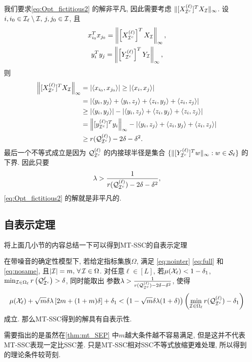 我们要求\eqref{eq:Opt_fictitious2} 的解非平凡, 因此需要考虑
\(\|[X_{\mathcal{I}^c}^{(\ell)}]^T X_{\mathcal{I}} \|_{\infty} \).
设\(i, i_0\in \mathcal{I}_\ell \setminus \mathcal{I}, \, j, j_0\in
\mathcal{I}\), 且
\begin{gather*}
x_{i_0}^T x_{j_0}=\left\|\left[X_{\mathcal{I}^c}^{(\ell)}\right]^T X_{\mathcal{I}}\right\|_\infty, \\
y_i^T y_j=\left\|\left[ Y_{\mathcal{I}^c}^{(\ell)}\right]^T Y_{\mathcal{I}}\right\|_\infty ,
\end{gather*}
则
\begin{align}
  \left\|[X_{\mathcal{I}^c}^{(\ell)}]^TX_{\mathcal{I}}\right\|_{\infty}&=\left|\langle x_{i_0},
  x_{j_0}\rangle\right|  \geq \left|\langle x_i, x_j\rangle\right|\nonumber\\
  &= \left|\langle y_i, y_j\rangle  + \langle y_i, z_j\rangle + \langle z_i, y_j\rangle + \langle z_i, z_j\rangle\right|\nonumber\\
  &\geq \left|\langle y_i, y_j\rangle\right| - \left|\langle y_i, z_j\rangle + \langle z_i, y_j\rangle + \langle z_i, z_j\rangle\right|\nonumber\\
  & = \left\|[y_{\mathcal{I}^c}^{(\ell)}]^Ty_i\right\|_{\infty} - \left|\langle y_i, z_j\rangle + \langle z_i, y_j\rangle + \langle z_i, z_j\rangle\right|\nonumber\\
  &\geq r(\mathcal{Q}^{(\ell)}_{\mathcal{I}^c}) - 2\delta - \delta^2. \label{eq:lowerbounding_maX_affinity}
\end{align}
最后一个不等式成立是因为 \(\mathcal{Q}^{(\ell)}_{\mathcal{I}^c}\) 
的内接球半径是集合 \(\{\| [ Y_{\mathcal{I}^c}^{(\ell)}]^T w\|_\infty: w
\in  \mathcal{S}_{\ell}\} \) 的下界. 因此只要
\begin{equation}\label{eq:lambda_low}
  \lambda > \frac{1}{ r(\mathcal{Q}^{(\ell)}_{\mathcal{I}^c}) - 2\delta - \delta^2},
\end{equation}
\eqref{eq:Opt_fictitious2} 的解就是非平凡的.

\subsection{自表示定理}
将上面几小节的内容总结一下可以得到MT-SSC的自表示定理
\begin{theorem}\label{thm:mt_SEP}
  在带噪音的确定性模型下, 若给定指标集族\(\Omega\), 满足 \eqref{eq:nointer} 
  \eqref{eq:full} 和 \eqref{eq:nosame}, 且\(|\mathcal{I}|=m, \, \forall\, \mathcal{I} \in \Omega\). 对任意\(\ell \in [L]\),
  若\(\mu(\mathcal{X}_\ell)<1-\delta_1\), \(\min_{\mathcal{I}\in
  \Omega_\ell} r\left(\mathcal{Q}^\ell_{\mathcal{I}^c}\right) > \delta\), 同时能取出
  参数\(\lambda > \frac{1}{ r(\mathcal{Q}^{(\ell)}_{\mathcal{I}^c}) - 2\delta -\delta^2}\),
  使得
  \[\mu(\mathcal{X}_\ell) +\sqrt{m}\delta\lambda \left[2m+(1+m)\delta \right] +\delta_1
  < \left(1-\sqrt{m}\delta\lambda(1+\delta)\right)\left(\min_{\mathcal{I}\in \Omega_\ell}
  r(\mathcal{Q}^{(\ell)}_{\mathcal{I}^c})-\delta_1\right)\]
  成立. 那么MT-SSC得到的解具有自表示性.
\end{theorem}
需要指出的是虽然在\autoref{thm:mt_SEP} 中\(m\)越大条件越不容易满足,
但是这并不代表MT-SSC表现一定比SSC差. 只是MT-SSC相对SSC不等式放缩更难处理,
所以得到的理论条件较苛刻.
